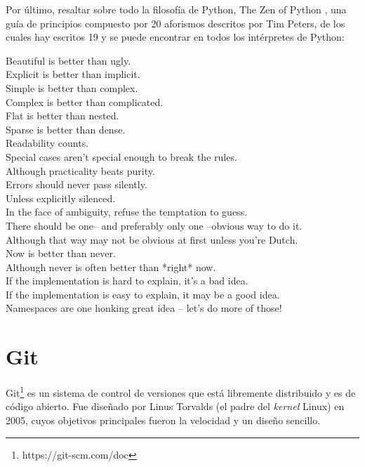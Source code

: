 \documentclass[a4paper, 12pt]{book}
\begin{document}
Por último, resaltar sobre todo la filosofía de Python, The Zen of Python \cite{peters2010zen}, una guía de principios compuesto por 20 aforismos descritos por Tim Peters, de los cuales hay escritos 19 y se puede encontrar en todos los intérpretes de Python: \\
\begin{itshape}
Beautiful is better than ugly. \\
Explicit is better than implicit. \\
Simple is better than complex. \\
Complex is better than complicated. \\
Flat is better than nested. \\
Sparse is better than dense. \\
Readability counts. \\
Special cases aren't special enough to break the rules. \\
Although practicality beats purity. \\
Errors should never pass silently. \\
Unless explicitly silenced. \\
In the face of ambiguity, refuse the temptation to guess. \\
There should be one-- and preferably only one --obvious way to do it. \\
Although that way may not be obvious at first unless you're Dutch. \\
Now is better than never. \\
Although never is often better than *right* now. \\
If the implementation is hard to explain, it's a bad idea. \\
If the implementation is easy to explain, it may be a good idea. \\
Namespaces are one honking great idea -- let's do more of those!
\end{itshape}



\section{Git} 
\label{sec:seccion2}

Git\footnote{https://git-scm.com/doc} es un sistema de control de versiones que está libremente distribuido y es de código abierto. Fue diseñado por Linus Torvalds (el padre del \textit{kernel} Linux) en 2005, cuyos objetivos principales fueron la velocidad y un diseño sencillo.
\end{document}
